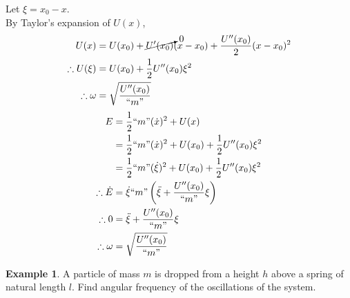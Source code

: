 \documentclass[fleqn, a4paper, 12pt]{article}
\theoremstyle{definition}
\newtheorem{example}{Example}
\theoremstyle{theorem}
\begin{document}
Let $\xi = x_0 - x$.\\
By Taylor's expansion of $U(x)$,
\begin{align*}
	U(x) &= U(x_0) + \cancelto{0}{U'(x_0)} (x - x_0) + \dfrac{U''(x_0)}{2} (x - x_0)^2\\
	\therefore U(\xi) &= U(x_0) + \dfrac{1}{2} U''(x_0) \xi^2\\
	\therefore \omega &= \sqrt{\dfrac{U''(x_0)}{``m"}}
\end{align*}
\begin{align*}
	E &= \dfrac{1}{2} ``m" (\dot{x})^2 + U(x)\\
	&= \dfrac{1}{2} ``m" (\dot{x})^2 + U(x_0) + \dfrac{1}{2} U''(x_0) \xi^2\\
	&= \dfrac{1}{2} ``m" (\dot{\xi})^2 + U(x_0) + \dfrac{1}{2} U''(x_0) \xi^2\\
	\therefore \dot{E} &= \dot{\xi} ``m" \left( \ddot{\xi} + \dfrac{U''(x_0)}{``m"} \xi \right)\\
	\therefore 0 &= \ddot{\xi} + \dfrac{U''(x_0)}{``m"} \xi\\
	\therefore \omega &= \sqrt{\dfrac{U''(x_0)}{``m"}}
\end{align*}



\begin{example}
	A particle of mass $m$ is dropped from a height $h$ above a spring of natural length $l$. Find angular frequency of the oscillations of the system.
\end{example}
\end{document}
